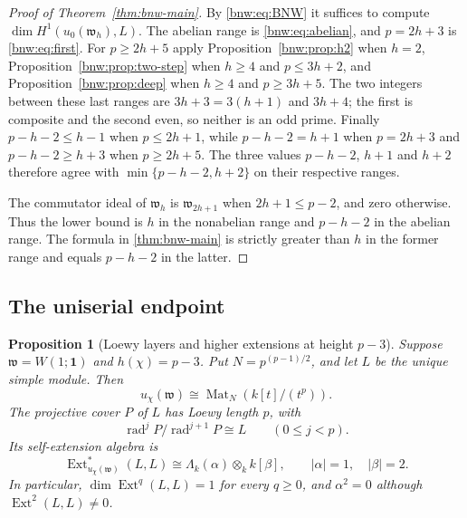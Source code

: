 \documentclass[11pt,reqno]{amsart}
\newtheorem{proposition}[proposition]{Proposition}
\theoremstyle{definition}
\theoremstyle{remark}
\theoremstyle{definition}
\newcommand{\Mat}{\operatorname{Mat}}
\newcommand{\Ext}{\operatorname{Ext}}
\newcommand{\rad}{\operatorname{rad}}
\begin{document}
\begin{proof}[Proof of Theorem~\ref{thm:bnw-main}]
By \eqref{bnw:eq:BNW} it suffices to compute $\dim H^1(u_0(\mathfrak{w}_h),L)$.
The abelian range is \eqref{bnw:eq:abelian}, and $p=2h+3$ is
\eqref{bnw:eq:first}. For $p\ge2h+5$ apply Proposition~\ref{bnw:prop:h2} when
$h=2$, Proposition~\ref{bnw:prop:two-step} when $h\ge4$ and $p\le3h+2$,
and Proposition~\ref{bnw:prop:deep} when $h\ge4$ and $p\ge3h+5$. The two
integers between these last ranges are $3h+3=3(h+1)$ and $3h+4$; the
first is composite and the second even, so neither is an odd prime.
Finally $p-h-2\le h-1$ when $p\le2h+1$, while $p-h-2=h+1$ when
$p=2h+3$ and $p-h-2\ge h+3$ when $p\ge2h+5$. The three values
$p-h-2$, $h+1$ and $h+2$ therefore agree with $\min\{p-h-2,h+2\}$ on
their respective ranges.

The commutator ideal of $\mathfrak w_h$ is $\mathfrak w_{2h+1}$
when $2h+1\le p-2$, and zero otherwise. Thus the lower bound is
$h$ in the nonabelian range and $p-h-2$ in the abelian range.
The formula in \cref{thm:bnw-main} is strictly greater than $h$
in the former range and equals $p-h-2$ in the latter.
\end{proof}


\subsection{The uniserial endpoint}

\begin{proposition}[Loewy layers and higher extensions at height $p-3$]
\label{prop:w11-uniserial-higher}
Suppose $\mathfrak w=W(1;\mathbf1)$ and $h(\chi)=p-3$.
Put $N=p^{(p-1)/2}$, and let $L$ be the unique simple module.
Then
\[
 u_\chi(\mathfrak w)\cong\Mat_N(k[t]/(t^p)).
\]
The projective cover $P$ of $L$ has Loewy length $p$, with
\[
 \rad^jP/\rad^{j+1}P\cong L\qquad(0\le j<p).
\]
Its self-extension algebra is
\[
 \Ext^*_{u_\chi(\mathfrak w)}(L,L)
 \cong\Lambda_k(\alpha)\otimes_k k[\beta],
 \qquad |\alpha|=1,\quad |\beta|=2.
\]
In particular, $\dim\Ext^q(L,L)=1$ for every $q\ge0$, and
$\alpha^2=0$ although $\Ext^2(L,L)\ne0$.
\end{proposition}
\end{document}

